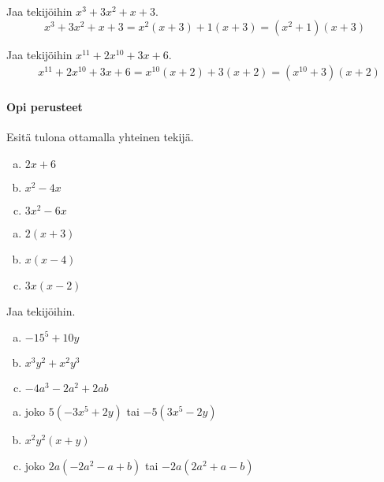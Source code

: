 \begin{esimerkki}
Jaa tekijöihin $x^3+3x^2+x+3$.
\begin{equation*}
x^3+3x^2+x+3=x^2(x+3)+1(x+3)=(x^2+1)(x+3)
\end{equation*}
\end{esimerkki}

\begin{esimerkki}
Jaa tekijöihin $x^{11}+2x^{10}+3x+6$.
\begin{align*}
& x^{11}+2x^{10}+3x+6=x^{10}(x+2)+3(x+2)=(x^{10}+3)(x+2)
\end{align*}
\end{esimerkki}

\begin{tehtavasivu}

\paragraph*{Opi perusteet}

\begin{tehtava}
    Esitä tulona ottamalla yhteinen tekijä.
    \begin{enumerate}[a)]
        \item $2x+6$
        \item $x^2 -4x$
        \item $3x^2 - 6x$
    \end{enumerate}
    \begin{vastaus}
        \begin{enumerate}[a)]
        \item $2(x+3)$
        \item $x(x-4)$
        \item $3x(x-2)$
        \end{enumerate}
    \end{vastaus}
\end{tehtava}

\begin{tehtava}
    Jaa tekijöihin.
    \begin{enumerate}[a)]
        \item $-15^5 +10y$
        \item $x^3y^2 +x^2y^3$
        \item $-4a^3 -2a^2 +2ab$
    \end{enumerate}
    \begin{vastaus}
        \begin{enumerate}[a)]
        \item joko $5(-3x^5 +2y)$ tai $-5(3x^5 -2y)$
        \item $x^2y^2(x+y)$
        \item joko $2a(-2a^2 -a +b)$ tai $-2a(2a^2 +a -b)$
        \end{enumerate}
    \end{vastaus}
\end{tehtava}


\end{tehtavasivu}
